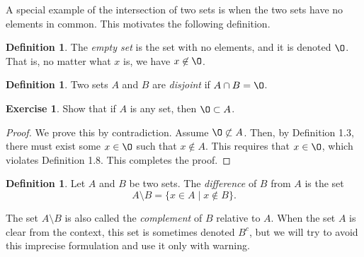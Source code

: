 \documentclass[11pt]{article}
\renewcommand{\emptyset}{\O}
\theoremstyle{definition}
\newtheorem{definition}[theorem]{Definition}
\newtheorem{exercise}[theorem]{Exercise}
\numberwithin{equation}{subsection}
\begin{document}
A special example of the intersection of two sets is when the two sets have no elements in common.
This motivates the following definition.

\begin{definition}  
The \emph{empty set} is the set with no elements, and it is denoted $\emptyset$.  That is,
no matter what $x$ is, we have $x\not\in \emptyset$.
\end{definition}  

\begin{definition}  
Two sets $A$ and $B$ are \emph{disjoint} if $A\cap B=\emptyset$.
\end{definition}  

\begin{exercise}  
Show that if $A$ is any set, then $\emptyset\subset A$.

\begin{proof}
We prove this by contradiction. Assume $\emptyset \not\subset A$. Then, by Definition 1.3, there must exist some $x \in \emptyset$ such that $x \notin A$. This requires that $x \in \emptyset$, which violates Definition 1.8. This completes the proof.

\renewcommand\qedsymbol{QED}

\end{proof}

\end{exercise}


\begin{definition}  
Let $A$ and $B$ be two sets. 
The \emph{difference} of $B$ from $A$ is the set
\[
A \setminus B = \{ x \in A \mid x \notin B \}.
\]
\end{definition}

The set $A \setminus B$ is also called the \emph{complement} of $B$ relative to $A$.
When the set $A$ is clear from the context, this set is sometimes denoted $B^{c}$, but we will 
try to avoid this imprecise formulation and use it only with warning.
\end{document}
